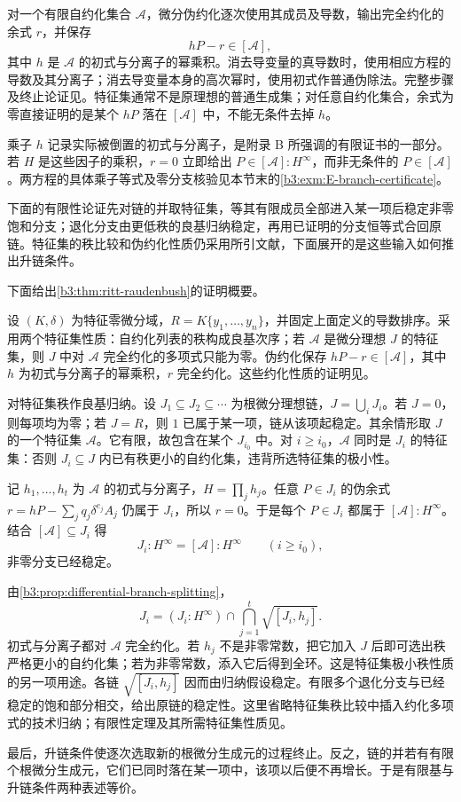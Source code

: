 \ProseParagraphBreak
对一个有限自约化集合 \(\mathcal A\)，微分伪约化逐次使用其成员及导数，输出完全约化的余式 \(r\)，并保存
\[
	hP-r\in[\mathcal A],
\]
其中 \(h\) 是 \(\mathcal A\) 的初式与分离子的幂乘积。消去导变量的真导数时，使用相应方程的导数及其分离子；消去导变量本身的高次幂时，使用初式作普通伪除法。完整步骤及终止论证见\cite[Section 3.1]{BoulierLazardOllivierPetitot2009DifferentialIdeals}。特征集通常不是原理想的普通生成集；对任意自约化集合，余式为零直接证明的是某个 \(hP\) 落在 \([\mathcal A]\) 中，不能无条件去掉 \(h\)。

乘子 \(h\) 记录实际被倒置的初式与分离子，是附录 B 所强调的有限证书的一部分。若 \(H\) 是这些因子的乘积，\(r=0\) 立即给出 \(P\in[\mathcal A]:H^\infty\)，而非无条件的 \(P\in[\mathcal A]\)。两方程的具体乘子等式及零分支核验见本节末的\cref{b3:exm:E-branch-certificate}。

下面的有限性论证先对链的并取特征集，等其有限成员全部进入某一项后稳定非零饱和分支；退化分支由更低秩的良基归纳稳定，再用已证明的分支恒等式合回原链。特征集的秩比较和伪约化性质仍采用所引文献，下面展开的是这些输入如何推出升链条件。

下面给出\cref{b3:thm:ritt-raudenbush}的证明概要。
\begin{proofsketch}
	设 \((K,\delta)\) 为特征零微分域，\(R=K\{y_1,\ldots,y_n\}\)，并固定上面定义的导数排序。采用两个特征集性质：自约化列表的秩构成良基次序；若 \(\mathcal A\) 是微分理想 \(J\) 的特征集，则 \(J\) 中对 \(\mathcal A\) 完全约化的多项式只能为零。伪约化保存 \(hP-r\in[\mathcal A]\)，其中 \(h\) 为初式与分离子的幂乘积，\(r\) 完全约化。这些约化性质的证明见\cite[Sections 3.2--3.3]{Hubert2003DifferentialSystems}。

	对特征集秩作良基归纳。设 \(J_1\subseteq J_2\subseteq\cdots\) 为根微分理想链，\(J=\bigcup_iJ_i\)。若 \(J=0\)，则每项均为零；若 \(J=R\)，则 \(1\) 已属于某一项，链从该项起稳定。其余情形取 \(J\) 的一个特征集 \(\mathcal A\)。它有限，故包含在某个 \(J_{i_0}\) 中。对 \(i\ge i_0\)，\(\mathcal A\) 同时是 \(J_i\) 的特征集：否则 \(J_i\subseteq J\) 内已有秩更小的自约化集，违背所选特征集的极小性。

	记 \(h_1,\ldots,h_t\) 为 \(\mathcal A\) 的初式与分离子，\(H=\prod_jh_j\)。任意 \(P\in J_i\) 的伪余式 \(r=hP-\sum_jq_j\delta^{e_j}A_j\) 仍属于 \(J_i\)，所以 \(r=0\)。于是每个 \(P\in J_i\) 都属于 \([\mathcal A]:H^\infty\)。结合 \([\mathcal A]\subseteq J_i\) 得
	\[
		J_i:H^\infty=[\mathcal A]:H^\infty\qquad(i\ge i_0),
	\]
	非零分支已经稳定。

	由\cref{b3:prop:differential-branch-splitting}，
	\[
		J_i=(J_i:H^\infty)\cap \bigcap_{j=1}^t\sqrt{[J_i,h_j]}.
	\]
	初式与分离子都对 \(\mathcal A\) 完全约化。若 \(h_j\) 不是非零常数，把它加入 \(J\) 后即可选出秩严格更小的自约化集；若为非零常数，添入它后得到全环。这是特征集极小秩性质的另一项用途。各链 \(\sqrt{[J_i,h_j]}\) 因而由归纳假设稳定。有限多个退化分支与已经稳定的饱和部分相交，给出原链的稳定性。这里省略特征集秩比较中插入约化多项式的技术归纳；有限性定理及其所需特征集性质见\cite[Section 2.2, Theorem 2.4; Section 3.3]{Hubert2003DifferentialSystems}。

	最后，升链条件使逐次选取新的根微分生成元的过程终止。反之，链的并若有有限个根微分生成元，它们已同时落在某一项中，该项以后便不再增长。于是有限基与升链条件两种表述等价。
\end{proofsketch}

